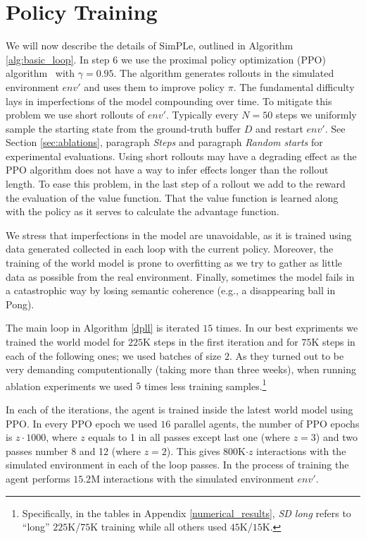 \section{Policy Training} \label{sec:policy_training}
We will now describe the details of SimPLe, outlined in Algorithm \ref{alg:basic_loop}.  In step 6 we use the proximal policy optimization (PPO) algorithm~\cite{ppo} with $\gamma=0.95$. The algorithm generates rollouts in the simulated environment $env'$ and uses them to improve policy $\pi$. The fundamental difficulty lays in imperfections of the model compounding over time. To mitigate this problem we use short rollouts of $env'$. Typically every $N=50$ steps we uniformly sample the starting state from the ground-truth buffer $D$ and restart $env'$. See Section \ref{sec:ablations}, paragraph {\em Steps} and paragraph {\em Random starts} for experimental evaluations. Using short rollouts may have a degrading effect as the PPO algorithm does not have a way to infer effects longer than the rollout length. To ease this problem, in the last step of a rollout we add to the reward the evaluation of the value function. That the value function is learned along with the policy as it serves to calculate the advantage function.

We stress that imperfections in the model are unavoidable, as it is trained using data generated collected in each loop with the current policy. Moreover, the training of the world model is prone to overfitting as we try to gather as little data as possible from the real environment. Finally, sometimes the model fails in a catastrophic way by losing semantic coherence (e.g., a disappearing ball in Pong).

The main loop in Algorithm \ref{dpll} is iterated $15$ times. In our best expriments we trained the world model for $225$K steps in the first iteration and for $75$K steps in each of the following ones; we used batches of size $2$. As they turned out to be very demanding computentionally (taking more than three weeks), when running ablation experiments we used $5$ times less training samples.\footnote{Specifically, in the tables in Appendix \ref{numerical_results}, \emph{SD long} refers to ``long'' $225$K/$75$K training while all others used $45$K/$15$K.} 


In each of the iterations, the agent is trained inside the latest world model using PPO. In every PPO epoch we used $16$ parallel agents, the number of PPO epochs is $z\cdot 1000$, where $z$ equals to 1 in all passes except last one (where $z = 3$) and two passes number 8 and 12 (where $z = 2$). This gives $800$K$\cdot z$ interactions with the simulated environment in each of the loop passes. In the process of training the agent performs  $15.2$M interactions with the simulated environment $env'$.
